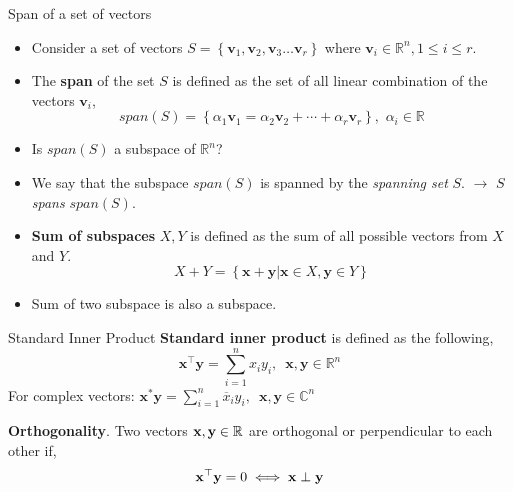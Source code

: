 \documentclass[aspectratio=169]{beamer}
\begin{document}
\begin{frame}[t]{Span of a set of vectors}
  \begin{itemize}
    \item Consider a set of vectors $S = \left\{\mathbf{v}_1, \mathbf{v}_2, \mathbf{v}_3 \ldots \mathbf{v}_r\right\}$ where $\mathbf{v}_i \in \mathbb{R}^n, 1 \leq i \leq r$.
    \item The \textbf{span} of the set $S$ is defined as the set of all linear combination of the vectors $\mathbf{v}_i$,
    \[ span\left(S\right) = \left\{\alpha_1\mathbf{v}_1 = \alpha_2\mathbf{v}_2 + \cdots + \alpha_r\mathbf{v}_r\right\}, \,\, \alpha_i \in \mathbb{R} \]
    \item Is $span\left(S\right)$ a subspace of $\mathbb{R}^n$?
    \item We say that the subspace $span\left(S\right)$ is spanned by the \textit{spanning set} $S$. $\longrightarrow$ $S$ \textit{spans} $span\left(S\right)$.
    \item \textbf{Sum of subspaces} $X, Y$ is defined as the sum of all possible vectors from $X$ and $Y$.
    \[ X + Y = \left\{\mathbf{x} + \mathbf{y} \left|\right. \mathbf{x} \in X, \mathbf{y} \in Y \right\} \]
    \item Sum of two subspace is also a subspace.
  \end{itemize}
\end{frame}  


\begin{frame}[t]{Standard Inner Product}
  \textbf{Standard inner product} is defined as the following,
  \[ \mathbf{x}^\top\mathbf{y} = \sum_{i=1}^{n}x_iy_i, \,\,\, \mathbf{x}, \mathbf{y} \in \mathbb{R}^n \]
  For complex vectors:  $\mathbf{x}^{*}\mathbf{y} = \sum_{i=1}^{n}\overline{x}_iy_i, \,\,\, \mathbf{x}, \mathbf{y} \in \mathbb{C}^n$
  \vspace{1cm} 
  
  \textbf{Orthogonality}. Two vectors $\mathbf{x}, \mathbf{y} \in \mathbb{R}$ are orthogonal or perpendicular to each other if,
  \[ \mathbf{x}^\top\mathbf{y} = 0 \iff \mathbf{x} \perp \mathbf{y} \]
\end{frame}
\end{document}
